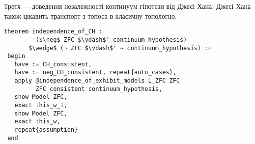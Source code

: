 Третя --- доведення незалежності континуум гіпотези від Джесі Хана.
Джесі Хана також цікавить транспорт з топоса в класичну топологію.

\begin{lstlisting}[mathescape=true]
 theorem independence_of_CH :
         ($\neg$ ZFC $\vdash$' continuum_hypothesis)
       $\wedge$ (¬ ZFC $\vdash$' ~ continuum_hypothesis) :=
 begin
   have := CH_consistent,
   have := neg_CH_consistent, repeat{auto_cases},
   apply @independence_of_exhibit_models L_ZFC ZFC
         ZFC_consistent continuum_hypothesis,
   show Model ZFC,
   exact this_w_1,
   show Model ZFC,
   exact this_w,
   repeat{assumption}
 end
\end{lstlisting}

